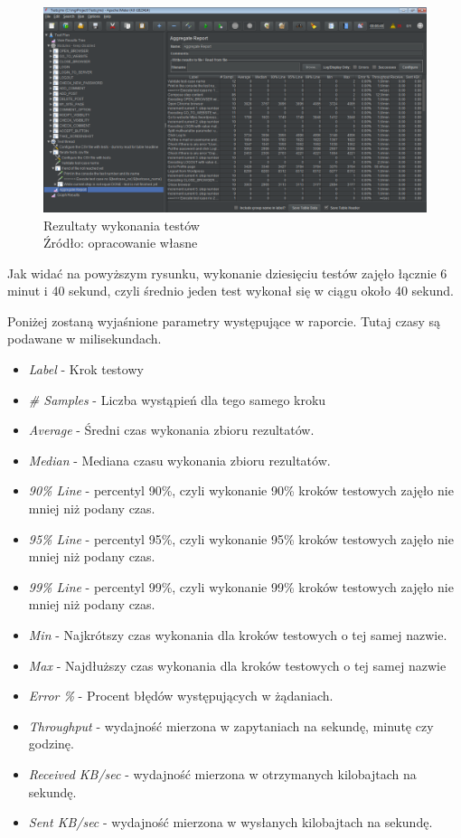 \begin{figure}[H]
\centering
\captionsetup{justification=centering}
\includegraphics[width=1.05\textwidth]{aggr.PNG}
\caption[Rezultaty wykonania testów]{\label{fig:ham}Rezultaty wykonania testów \\ Źródło: opracowanie własne}
\end{figure}

Jak widać na powyższym rysunku, wykonanie dziesięciu testów zajęło łącznie 6 minut i 40 sekund, czyli średnio jeden test wykonał się w ciągu około 40 sekund.


Poniżej zostaną wyjaśnione parametry występujące w raporcie. Tutaj czasy są podawane w milisekundach.

\begin{itemize}
    \item \textit{Label} - Krok testowy
    \item \textit{\# Samples} - Liczba wystąpień dla tego samego kroku
    \item \textit{Average} - Średni czas wykonania zbioru rezultatów.
    \item \textit{Median} - Mediana czasu wykonania zbioru rezultatów.
    \item \textit{90\% Line} - percentyl 90\%, czyli wykonanie 90\% kroków testowych zajęło nie mniej niż podany czas.
    \item \textit{95\% Line} - percentyl 95\%, czyli wykonanie 95\% kroków testowych zajęło nie mniej niż podany czas.
    \item \textit{99\% Line} - percentyl 99\%, czyli wykonanie 99\% kroków testowych zajęło nie mniej niż podany czas.
    \item \textit{Min} - Najkrótszy czas wykonania dla kroków testowych o tej samej nazwie.
    \item \textit{Max} - Najdłuższy czas wykonania dla kroków testowych o tej samej nazwie
    \item \textit{Error \%} - Procent błędów występujących w żądaniach.
    \item \textit{Throughput} - wydajność mierzona w zapytaniach na sekundę, minutę czy godzinę.
    \item \textit{Received KB/sec} - wydajność mierzona w otrzymanych kilobajtach na sekundę.
    \item \textit{Sent KB/sec} - wydajność mierzona w wysłanych kilobajtach na sekundę.
\end{itemize}



